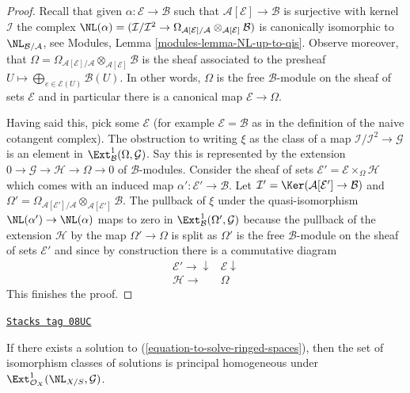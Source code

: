 \begin{proof}
Recall that given $\alpha : \mathcal{E} \to \mathcal{B}$
such that $\mathcal{A}[\mathcal{E}] \to \mathcal{B}$ is surjective
with kernel $\mathcal{I}$ the complex
$\NL(\alpha) = (\mathcal{I}/\mathcal{I}^2 \to
\Omega_{\mathcal{A}[\mathcal{E}]/\mathcal{A}}
\otimes_{\mathcal{A}[\mathcal{E}]} \mathcal{B})$ is canonically
isomorphic to $\NL_{\mathcal{B}/\mathcal{A}}$, see
Modules, Lemma \ref{modules-lemma-NL-up-to-qis}.
Observe moreover, that
$\Omega = \Omega_{\mathcal{A}[\mathcal{E}]/\mathcal{A}}
\otimes_{\mathcal{A}[\mathcal{E}]} \mathcal{B}$ is the sheaf
associated to the presheaf
$U \mapsto \bigoplus_{e \in \mathcal{E}(U)} \mathcal{B}(U)$.
In other words, $\Omega$ is the free $\mathcal{B}$-module on the
sheaf of sets $\mathcal{E}$ and in particular there is a canonical
map $\mathcal{E} \to \Omega$.

\medskip\noindent
Having said this, pick some $\mathcal{E}$ (for example
$\mathcal{E} = \mathcal{B}$ as in the definition of the naive cotangent
complex). The obstruction to writing $\xi$ as the class of a map
$\mathcal{I}/\mathcal{I}^2 \to \mathcal{G}$ is an element in
$\Ext^1_\mathcal{B}(\Omega, \mathcal{G})$. Say this is represented
by the extension $0 \to \mathcal{G} \to \mathcal{H} \to \Omega \to 0$
of $\mathcal{B}$-modules. Consider the sheaf of sets
$\mathcal{E}' = \mathcal{E} \times_\Omega \mathcal{H}$
which comes with an induced map $\alpha' : \mathcal{E}' \to \mathcal{B}$.
Let $\mathcal{I}' = \Ker(\mathcal{A}[\mathcal{E}'] \to \mathcal{B})$
and $\Omega' = \Omega_{\mathcal{A}[\mathcal{E}']/\mathcal{A}}
\otimes_{\mathcal{A}[\mathcal{E}']} \mathcal{B}$.
The pullback of $\xi$ under the quasi-isomorphism
$\NL(\alpha') \to \NL(\alpha)$ maps to zero in
$\Ext^1_\mathcal{B}(\Omega', \mathcal{G})$
because the pullback of the extension $\mathcal{H}$
by the map $\Omega' \to \Omega$ is split as $\Omega'$ is the free
$\mathcal{B}$-module on the sheaf of sets $\mathcal{E}'$ and since
by construction there is a commutative diagram
$$
\begin{array}{cc}\mathcal{E}' \longrightarrow\downarrow & \mathcal{E} \downarrow \\ \mathcal{H} \longrightarrow & \Omega\end{array}
$$
This finishes the proof.
\end{proof}

\begin{lemma}
\label{defos-lemma-choices-ringed-spaces}
\href{https://stacks.math.columbia.edu/tag/08UC}{\texttt{Stacks tag 08UC}}

If there exists a solution to (\ref{equation-to-solve-ringed-spaces}),
then the set of isomorphism classes of solutions is principal homogeneous
under $\Ext^1_{\mathcal{O}_X}(\NL_{X/S}, \mathcal{G})$.
\end{lemma}

